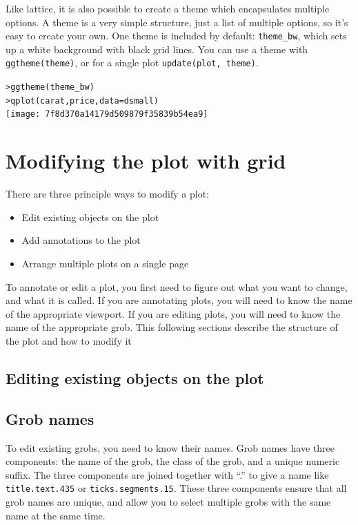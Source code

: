 Like lattice, it is also possible to create a theme which encapsulates multiple options.  A theme is a very simple structure, just a list of multiple options, so it's  easy to create your own.  One theme is included by default: {\tt theme\_bw}, which sets up a white background with black grid lines.  You can use a theme with {\tt ggtheme(theme)}, or for a single plot {\tt update(plot, theme)}.

\begin{alltt}
> ggtheme(theme_bw)
> qplot(carat, price, data = dsmall)
\texttt{[image: 7f8d370a14179d509879f35839b54ea9]}

\end{alltt}

\section{Modifying the plot with grid}

There are three principle ways to modify a plot:

\begin{itemize}
  \item Edit existing objects on the plot
  \item Add annotations to the plot
  \item Arrange multiple plots on a single page
\end{itemize}

To annotate or edit a plot, you first need to figure out what you want to change, and what it is called.  If you are annotating plots, you will need to know the name of the appropriate viewport.  If you are editing plots, you will need to know the name of the appropriate grob.  This following sections describe the structure of the plot and how to modify it

\subsection{Editing existing objects on the plot}

\subsection{Grob names}

To edit existing grobs, you need to know their names.  Grob names have three components: the name of the grob, the class of the grob, and a unique numeric suffix.  The three components are joined together with ``.'' to give a name like {\tt title.text.435} or {\tt ticks.segments.15}.  These three components ensure that all grob names are unique, and allow you to select multiple grobs with the same name at the same time.

